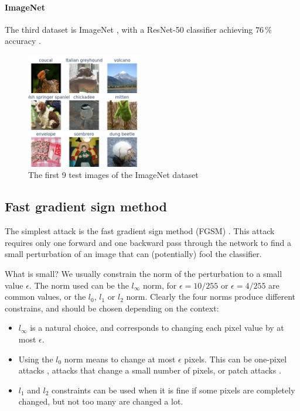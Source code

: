 \documentclass[]{scrarticle}
\begin{document}
\paragraph{ImageNet}
The third dataset is ImageNet \cite{Deng2009ImageNetAL}, with a ResNet-50 classifier
achieving $76\,\%$ accuracy \cite{He2015DeepRL}.

\begin{figure}[h]
  \centering
  \includegraphics[width=0.45\textwidth]{images/sample_ImageNet.png}
  \caption{The first 9 test images of the ImageNet dataset}
  \label{fig:imagenet_samples}
\end{figure}


\subsection{Fast gradient sign method}
The simplest attack is the fast gradient sign method (FGSM) \cite{goodfellow2014explaining}.
This attack requires only one forward and one backward pass through the network
to find a small perturbation of an image that can (potentially) fool the classifier.

What is small? We usually constrain the norm of the perturbation to
a small value $\epsilon$. The norm used can be the $l_\infty$ norm,
for $\epsilon = 10 / 255$ or $\epsilon = 4 / 255$ are common values,
or the $l_0$, $l_1$ or $l_2$ norm.
Clearly the four norms produce different constrains, and should be chosen
depending on the context:
\begin{itemize}
  \item $l_\infty$ is a natural choice, and corresponds to changing each
    pixel value by at most $\epsilon$.
  \item Using the $l_0$ norm means to change at most $\epsilon$ pixels. This
    can be one-pixel attacks \cite{Su2017OnePA},
    attacks that change a small number of pixels,
    or patch attacks \cite{Brown2017AdversarialP}.
  \item $l_1$ and $l_2$ constraints can be used when it is fine if
    some pixels are completely changed, but not too many are changed
    a lot.
\end{itemize}
\end{document}
